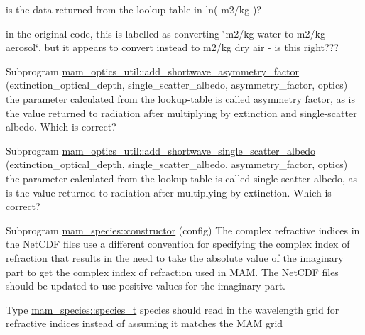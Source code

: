 \begin{DoxyRefList}
\label{todo__todo000008}%
%
is the data returned from the lookup table in ln( m2/kg )? 

\label{todo__todo000009}%
%
in the original code, this is labelled as converting \char`\"{}m2/kg  water to m2/kg aerosol\char`\"{}, but it appears to convert instead to m2/kg dry air -\/ is this right???  
\item[Subprogram \mbox{\hyperlink{namespacemam__optics__util_a0149038eae747d9b5e3809633415bab6}{mam\+\_\+optics\+\_\+util\+::add\+\_\+shortwave\+\_\+asymmetry\+\_\+factor}} (extinction\+\_\+optical\+\_\+depth, single\+\_\+scatter\+\_\+albedo, asymmetry\+\_\+factor, optics)]\label{todo__todo000013}%
%
the parameter calculated from the lookup-\/table is called asymmetry factor, as is the value returned to radiation after multiplying by extinction and single-\/scatter albedo. Which is correct?  
\item[Subprogram \mbox{\hyperlink{namespacemam__optics__util_a8b91778ceede0fba8cfe3ee54c8e2a6c}{mam\+\_\+optics\+\_\+util\+::add\+\_\+shortwave\+\_\+single\+\_\+scatter\+\_\+albedo}} (extinction\+\_\+optical\+\_\+depth, single\+\_\+scatter\+\_\+albedo, asymmetry\+\_\+factor, optics)]\label{todo__todo000012}%
%
the parameter calculated from the lookup-\/table is called single-\/scatter albedo, as is the value returned to radiation after multiplying by extinction. Which is correct?  
\item[Subprogram \mbox{\hyperlink{namespacemam__species_a1155acd61c6fe7c1c3192dd41b618b53}{mam\+\_\+species\+::constructor}} (config)]\label{todo__todo000015}%
%
The complex refractive indices in the Net\+CDF files use a different convention for specifying the complex index of refraction that results in the need to take the absolute value of the imaginary part to get the complex index of refraction used in MAM. The Net\+CDF files should be updated to use positive values for the imaginary part.  
\item[Type \mbox{\hyperlink{structmam__species_1_1species__t}{mam\+\_\+species\+::species\+\_\+t}} ]\label{todo__todo000014}%
%
species should read in the wavelength grid for refractive indices instead of assuming it matches the MAM grid 
\end{DoxyRefList}